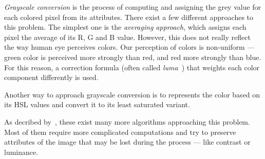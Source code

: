 \emph{Grayscale conversion} is the process of computing and assigning the grey value for each colored pixel from its attributes. There exist a few different approaches to this problem. The simplest one is the \emph{averaging approach}, which assigns each pixel the average of its R, G and B value. However, this does not really reflect the way human eye perceives colors. Our perception of colors is non-uniform --- green color is perceived more strongly than red, and red more strongly than blue. For this reason, a correction formula (often called \emph{luma}~\cite{grayscaleConv}) that weights each color component differently is used. 

Another way to approach grayscale conversion is to represents the color based on its HSL values and convert it to its least saturated variant.

As decribed by~\citet{grayscaleCadik}, these exist many more algorithms approaching this problem. Most of them require more complicated computations and try to preserve attributes of the image that may be lost during the process --- like contrast or luminance.

